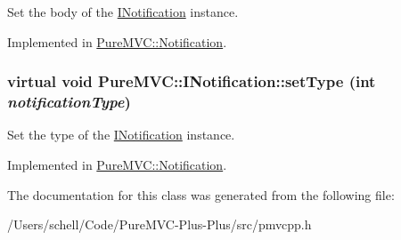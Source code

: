 Set the body of the {\ttfamily \hyperlink{class_pure_m_v_c_1_1_i_notification}{INotification}} instance. 

Implemented in \hyperlink{class_pure_m_v_c_1_1_notification_a9cae1ba418db7451e7afd6ddd40b2cbf}{PureMVC::Notification}.\hypertarget{class_pure_m_v_c_1_1_i_notification_a2e9d5946b96b759c2f3799377ea4acdc}{
\subsubsection[{setType}]{\setlength{\rightskip}{0pt plus 5cm}virtual void PureMVC::INotification::setType (int {\em notificationType})}}
\label{class_pure_m_v_c_1_1_i_notification_a2e9d5946b96b759c2f3799377ea4acdc}


Set the type of the {\ttfamily \hyperlink{class_pure_m_v_c_1_1_i_notification}{INotification}} instance. 

Implemented in \hyperlink{class_pure_m_v_c_1_1_notification_aeec90bbe612bca8631ac92c13727feef}{PureMVC::Notification}.

The documentation for this class was generated from the following file:\begin{DoxyCompactItemize}
\item 
/Users/schell/Code/PureMVC-\/Plus-\/Plus/src/pmvcpp.h\end{DoxyCompactItemize}
